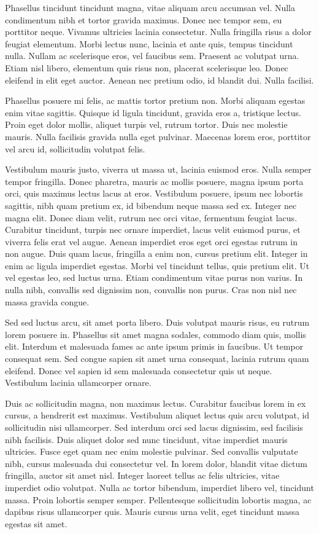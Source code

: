 \documentclass[book,A4paper,10pt,twoside,oldfontcommands]{memoir}\usepackage[]{graphicx}\usepackage[usenames,dvipsnames]{color}
\begin{document}
Phasellus tincidunt tincidunt magna, vitae aliquam arcu accumsan vel.
Nulla condimentum nibh et tortor gravida maximus. Donec nec tempor
sem, eu porttitor neque. Vivamus ultricies lacinia consectetur. Nulla
fringilla risus a dolor feugiat elementum. Morbi lectus nunc, lacinia
et ante quis, tempus tincidunt nulla. Nullam ac scelerisque eros, vel
faucibus sem. Praesent ac volutpat urna. Etiam nisl libero, elementum
quis risus non, placerat scelerisque leo. Donec eleifend in elit eget
auctor. Aenean nec pretium odio, id blandit dui. Nulla facilisi.

Phasellus posuere mi felis, ac mattis tortor pretium non. Morbi
aliquam egestas enim vitae sagittis. Quisque id ligula tincidunt,
gravida eros a, tristique lectus. Proin eget dolor mollis, aliquet
turpis vel, rutrum tortor. Duis nec molestie mauris. Nulla facilisis
gravida nulla eget pulvinar. Maecenas lorem eros, porttitor vel arcu
id, sollicitudin volutpat felis.

Vestibulum mauris justo, viverra ut massa ut, lacinia euismod eros.
Nulla semper tempor fringilla. Donec pharetra, mauris ac mollis
posuere, magna ipsum porta orci, quis maximus lectus lacus at eros.
Vestibulum posuere, ipsum nec lobortis sagittis, nibh quam pretium ex,
id bibendum neque massa sed ex. Integer nec magna elit. Donec diam
velit, rutrum nec orci vitae, fermentum feugiat lacus. Curabitur
tincidunt, turpis nec ornare imperdiet, lacus velit euismod purus, et
viverra felis erat vel augue. Aenean imperdiet eros eget orci egestas
rutrum in non augue. Duis quam lacus, fringilla a enim non, cursus
pretium elit. Integer in enim ac ligula imperdiet egestas. Morbi vel
tincidunt tellus, quis pretium elit. Ut vel egestas leo, sed luctus
urna. Etiam condimentum vitae purus non varius. In nulla nibh,
convallis sed dignissim non, convallis non purus. Cras non nisl nec
massa gravida congue.

Sed sed luctus arcu, sit amet porta libero. Duis volutpat mauris
risus, eu rutrum lorem posuere in. Phasellus sit amet magna sodales,
commodo diam quis, mollis elit. Interdum et malesuada fames ac ante
ipsum primis in faucibus. Ut tempor consequat sem. Sed congue sapien
sit amet urna consequat, lacinia rutrum quam eleifend. Donec vel
sapien id sem malesuada consectetur quis ut neque. Vestibulum lacinia
ullamcorper ornare.

Duis ac sollicitudin magna, non maximus lectus. Curabitur faucibus
lorem in ex cursus, a hendrerit est maximus. Vestibulum aliquet lectus
quis arcu volutpat, id sollicitudin nisi ullamcorper. Sed interdum
orci sed lacus dignissim, sed facilisis nibh facilisis. Duis aliquet
dolor sed nunc tincidunt, vitae imperdiet mauris ultricies. Fusce eget
quam nec enim molestie pulvinar. Sed convallis vulputate nibh, cursus
malesuada dui consectetur vel. In lorem dolor, blandit vitae dictum
fringilla, auctor sit amet nisl. Integer laoreet tellus ac felis
ultricies, vitae imperdiet odio volutpat. Nulla ac tortor bibendum,
imperdiet libero vel, tincidunt massa. Proin lobortis semper semper.
Pellentesque sollicitudin lobortis magna, ac dapibus risus ullamcorper
quis. Mauris cursus urna velit, eget tincidunt massa egestas sit amet.
\end{document}
